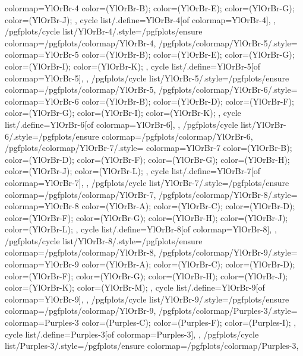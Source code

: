 {{    colormap={YlOrBr-4}{
      color=(YlOrBr-B);
      color=(YlOrBr-E);
      color=(YlOrBr-G);
      color=(YlOrBr-J);
    },
    cycle list/.define={YlOrBr-4}{[of colormap=YlOrBr-4]},
  },
  /pgfplots/cycle list/YlOrBr-4/.style={/pgfplots/ensure colormap={/pgfplots/colormap/YlOrBr-4}},
  /pgfplots/colormap/YlOrBr-5/.style={
    colormap={YlOrBr-5}{
      color=(YlOrBr-B);
      color=(YlOrBr-E);
      color=(YlOrBr-G);
      color=(YlOrBr-I);
      color=(YlOrBr-K);
    },
    cycle list/.define={YlOrBr-5}{[of colormap=YlOrBr-5]},
  },
  /pgfplots/cycle list/YlOrBr-5/.style={/pgfplots/ensure colormap={/pgfplots/colormap/YlOrBr-5}},
  /pgfplots/colormap/YlOrBr-6/.style={
    colormap={YlOrBr-6}{
      color=(YlOrBr-B);
      color=(YlOrBr-D);
      color=(YlOrBr-F);
      color=(YlOrBr-G);
      color=(YlOrBr-I);
      color=(YlOrBr-K);
    },
    cycle list/.define={YlOrBr-6}{[of colormap=YlOrBr-6]},
  },
  /pgfplots/cycle list/YlOrBr-6/.style={/pgfplots/ensure colormap={/pgfplots/colormap/YlOrBr-6}},
  /pgfplots/colormap/YlOrBr-7/.style={
    colormap={YlOrBr-7}{
      color=(YlOrBr-B);
      color=(YlOrBr-D);
      color=(YlOrBr-F);
      color=(YlOrBr-G);
      color=(YlOrBr-H);
      color=(YlOrBr-J);
      color=(YlOrBr-L);
    },
    cycle list/.define={YlOrBr-7}{[of colormap=YlOrBr-7]},
  },
  /pgfplots/cycle list/YlOrBr-7/.style={/pgfplots/ensure colormap={/pgfplots/colormap/YlOrBr-7}},
  /pgfplots/colormap/YlOrBr-8/.style={
    colormap={YlOrBr-8}{
      color=(YlOrBr-A);
      color=(YlOrBr-C);
      color=(YlOrBr-D);
      color=(YlOrBr-F);
      color=(YlOrBr-G);
      color=(YlOrBr-H);
      color=(YlOrBr-J);
      color=(YlOrBr-L);
    },
    cycle list/.define={YlOrBr-8}{[of colormap=YlOrBr-8]},
  },
  /pgfplots/cycle list/YlOrBr-8/.style={/pgfplots/ensure colormap={/pgfplots/colormap/YlOrBr-8}},
  /pgfplots/colormap/YlOrBr-9/.style={
    colormap={YlOrBr-9}{
      color=(YlOrBr-A);
      color=(YlOrBr-C);
      color=(YlOrBr-D);
      color=(YlOrBr-F);
      color=(YlOrBr-G);
      color=(YlOrBr-H);
      color=(YlOrBr-J);
      color=(YlOrBr-K);
      color=(YlOrBr-M);
    },
    cycle list/.define={YlOrBr-9}{[of colormap=YlOrBr-9]},
  },
  /pgfplots/cycle list/YlOrBr-9/.style={/pgfplots/ensure colormap={/pgfplots/colormap/YlOrBr-9}},
  /pgfplots/colormap/Purples-3/.style={
    colormap={Purples-3}{
      color=(Purples-C);
      color=(Purples-F);
      color=(Purples-I);
    },
    cycle list/.define={Purples-3}{[of colormap=Purples-3]},
  },
  /pgfplots/cycle list/Purples-3/.style={/pgfplots/ensure colormap={/pgfplots/colormap/Purples-3}},
}
